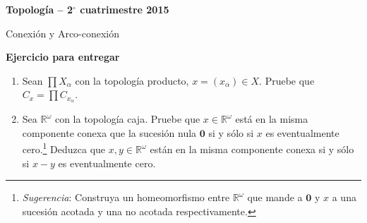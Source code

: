 \documentclass[11pt]{article}
\begin{document}
\pagestyle{empty}
\pagestyle{fancy}
\fancyfoot[CO]{\slshape \thepage}
\renewcommand{\headrulewidth}{0pt}


\centerline{\bf Topolog\'ia -- 2$^\circ$
cuatrimestre 2015}
\centerline{\sc Conexi\'on y Arco-conexi\'on}

\bigskip

\textbf{Ejercicio para entregar}

\begin{enumerate}
\item Sean $\prod X_{\alpha}$ con la topolog\'ia producto,  $x= (x_{\alpha})\in X$. Pruebe que $C_{x}=\prod C_{x_{\alpha}}$.

\item Sea $\mathbb{R}^{\omega}$ con la topolog\'ia caja. Pruebe que $x\in \mathbb{R}^{\omega}$ est\'a en la misma componente conexa que la sucesi\'on  nula $\mathbf 0$ si y s\'olo si $x$ es eventualmente cero.\footnote{\textit{Sugerencia}: Construya un homeomorfismo entre $\mathbb{R}^{\omega}$ que mande a $\mathbf 0$ y $x$ a 
una sucesi\'on acotada y una no acotada respectivamente.} Deduzca que  $x,y\in \mathbb{R}^{\omega}$ est\'an en la misma componente conexa si y s\'olo si $x-y$ es eventualmente cero.

\end{enumerate}
\end{document}
